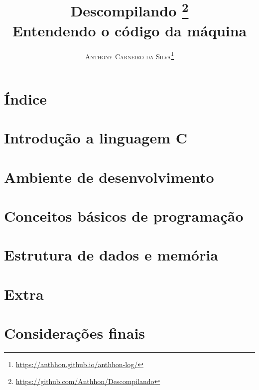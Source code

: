 \documentclass[12pt,oneside]{book}
\title{\Huge \textbf{Descompilando}  \footnote{\url{https://github.com/Anthhon/Descompilando}} \\ \huge Entendendo o código da máquina}
\author{\textsc{Anthony Carneiro da Silva}\footnote{\url{https://anthhon.github.io/anthhon-log/}}}
\begin{document}
\maketitle

\tableofcontents

\chapter{Índice}
\clearpage %


\chapter{Introdução a linguagem C}
\clearpage %


\chapter{Ambiente de desenvolvimento}
\clearpage %


\chapter{Conceitos básicos de programação}
\clearpage %


\chapter{Estrutura de dados e memória}
\clearpage %


\chapter{Extra}
\clearpage %


\chapter{Considerações finais}
\clearpage %

\end{document}
